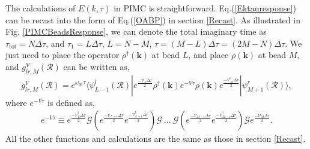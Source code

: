 \documentclass[12pt,letterpaper,UTF8]{report}
\begin{document}
The calculations of $E(k,\tau)$ in PIMC is straightforward. Eq.(\ref{Ektauresponse}) can be recast into the form of Eq.(\ref{OABP}) in section \ref{Recast}. As illustrated in Fig. \ref{PIMCBeadsResponse}, we can denote the total imaginary time as $\tau_{\textrm{tot}}=N\Delta \tau$, and $\tau_1=L \Delta \tau$, $L=N-M$, $\tau=(M-L)\Delta \tau =(2M-N) \Delta \tau$.
We just need to place the operator $\rho^\dagger(\bm{k})$ at bead $L$, and place $\rho (\bm{k})$ at bead $M$, and $g^V_{lr,M}(\mathcal{R})$ can be written as,
\begin{equation}
 g^V_{lr,M}(\mathcal{R}) = e^{\omega_{qe}\tau}   \langle \psi^l_{L\!-\!1}  (\mathcal{R}) |
 e^{\frac{- \mathcal{V}_L  \Delta \tau }{2}} \rho^\dagger(\bm{k}) e^{-V\tau} \rho(\bm{k}) e^{\frac{- \mathcal{V}^\dagger_M  \Delta \tau }{2}}
 | \psi^r_{M\!+\!1} (\mathcal{R}) \rangle ,
\label{gVRlrresponse}
\end{equation}
where $ e^{-V\tau}$ is defined as,
\begin{eqnarray}
e^{-V\tau} \! \equiv
 e^{\frac{- \mathcal{V}^\dagger_L  \Delta \tau }{2}} \bm{\mathcal{G}}
 \left(e^{\frac{- \mathcal{V}_{L+1}  \Delta \tau }{2}}  e^{\frac{- \mathcal{V}^\dagger_{L+1}  \Delta \tau }{2}}\right) \bm{\mathcal{G}} ~...~
 \bm{\mathcal{G}} \left(e^{\frac{- \mathcal{V}_{M-1}  \Delta \tau }{2}}  e^{\frac{- \mathcal{V}^\dagger_{M-1}  \Delta \tau }{2}} \right)\bm{\mathcal{G}}
 e^{\frac{- \mathcal{V}_M  \Delta \tau }{2}}  .
\label{eVtaudef}
\end{eqnarray}
All the other functions and calculations are the same as those in section \ref{Recast}.
\end{document}
